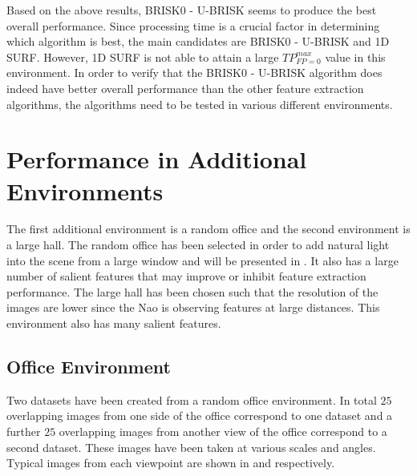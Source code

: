 \documentclass[11pt]{report}
\begin{document}
Based on the above results, BRISK0 - U-BRISK seems to produce the best overall performance. Since processing time is a crucial factor in determining which algorithm is best, the main candidates are BRISK0 - U-BRISK and 1D SURF. However, 1D SURF is not able to attain a large $TP_{FP=0}^{max}$ value in this environment. In order to verify that the BRISK0 - U-BRISK algorithm does indeed have better overall performance than the other feature extraction algorithms, the algorithms need to be tested in various different environments.\\ 


\section{Performance in Additional Environments}
\label{sec:additionalDataset}
The first additional environment is a random office and the second environment is a large hall. The random office has been selected in order to add natural light into the scene from a large window and will be presented in . It also has a large number of salient features that may improve or inhibit feature extraction performance. The large hall has been chosen such that the resolution of the images are lower since the Nao is observing features at large distances. This environment also has many salient features. \\

\subsection{Office Environment}
\label{sec:office}
Two datasets have been created from a random office environment. In total $25$ overlapping images from one side of the office correspond to one dataset and a further $25$ overlapping images from another view of the office correspond to a second dataset. These images have been taken at various scales and angles. Typical images from each viewpoint are shown in  and  respectively.\\
\end{document}

